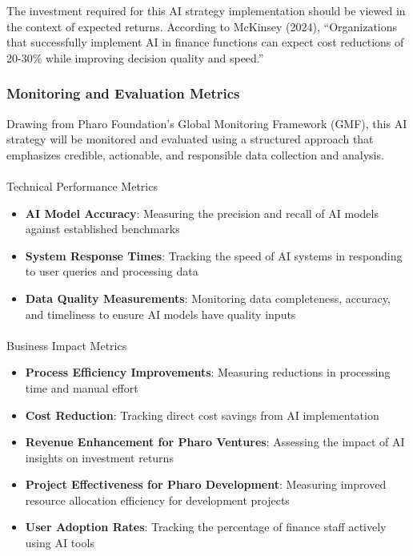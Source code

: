 \documentclass[
]{article}
\makeatletter
\let\oldparagraph\paragraph
\renewcommand{\paragraph}{
    \@ifstar
      \xxxParagraphStar
      \xxxParagraphNoStar
  }
\newcommand{\xxxParagraphStar}[1]{\oldparagraph*{#1}\mbox{}}
\newcommand{\xxxParagraphNoStar}[1]{\oldparagraph{#1}\mbox{}}
\providecommand{\tightlist}{%
  \setlength{\itemsep}{0pt}\setlength{\parskip}{0pt}}\usepackage{longtable,booktabs,array}
\makeatother
\begin{document}
The investment required for this AI strategy implementation should be
viewed in the context of expected returns. According to McKinsey (2024),
``Organizations that successfully implement AI in finance functions can
expect cost reductions of 20-30\% while improving decision quality and
speed.''

\subsubsection{Monitoring and Evaluation
Metrics}\label{monitoring-and-evaluation-metrics}

Drawing from Pharo Foundation's Global Monitoring Framework (GMF), this
AI strategy will be monitored and evaluated using a structured approach
that emphasizes credible, actionable, and responsible data collection
and analysis.

\paragraph{Technical Performance
Metrics}\label{technical-performance-metrics}

\begin{itemize}
\tightlist
\item
  \textbf{AI Model Accuracy}: Measuring the precision and recall of AI
  models against established benchmarks
\item
  \textbf{System Response Times}: Tracking the speed of AI systems in
  responding to user queries and processing data
\item
  \textbf{Data Quality Measurements}: Monitoring data completeness,
  accuracy, and timeliness to ensure AI models have quality inputs
\end{itemize}

\paragraph{Business Impact Metrics}\label{business-impact-metrics}

\begin{itemize}
\tightlist
\item
  \textbf{Process Efficiency Improvements}: Measuring reductions in
  processing time and manual effort
\item
  \textbf{Cost Reduction}: Tracking direct cost savings from AI
  implementation
\item
  \textbf{Revenue Enhancement for Pharo Ventures}: Assessing the impact
  of AI insights on investment returns
\item
  \textbf{Project Effectiveness for Pharo Development}: Measuring
  improved resource allocation efficiency for development projects
\item
  \textbf{User Adoption Rates}: Tracking the percentage of finance staff
  actively using AI tools
\end{itemize}
\end{document}
